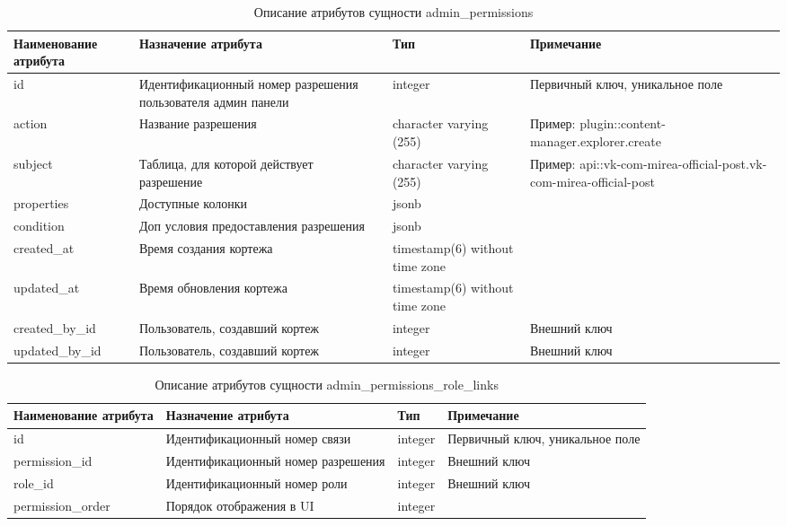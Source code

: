 \documentclass{mirea}
\begin{document}
	\begin{longtable}{ |p{}|p{}|p{}|p{}| } 
		\caption{Описание атрибутов сущности admin\_permissions}
		\label{tab:attributes_first_table}
		\endfirsthead
		\endhead
		\hline
		Наименование атрибута & Назначение атрибута & Тип & Примечание \\ \hline
		
		id & Идентификацион\-ный номер разрешения пользователя админ панели & integer & Первичный ключ, уникальное поле \\ \hline
		
		action & Название разрешения & character varying (255) & Пример: plugin::content-manager.explorer.\-create \\ \hline
		
		subject & Таблица, для которой действует разрешение  & character varying (255) & Пример: api::vk-com-mirea-official-post.vk-com-mirea-official-post \\ \hline
		
		properties & Доступные колонки  & jsonb & \\ \hline
		
		condition & Доп условия предоставления разрешения & jsonb & \\ \hline
		
		created\_at & Время создания кортежа & timestamp(6) without time zone & \\ \hline
		
		updated\_at & Время обновления кортежа & timestamp(6) without time zone & \\ \hline
		
		created\_by\_id & Пользователь, создавший кортеж & integer & Внешний ключ \\ \hline
		
		updated\_by\_id & Пользователь, создавший кортеж & integer & Внешний ключ \\ \hline
		
	\end{longtable}

	\begin{longtable}{ |p{}|p{}|p{}|p{}| } 
		\caption{Описание атрибутов сущности admin\_permissions\_role\_links}
		\endfirsthead
		\endhead
		\hline
		Наименование атрибута & Назначение атрибута & Тип & Примечание \\ \hline
		
		id & Идентификацион\-ный номер связи & integer & Первичный ключ, уникальное поле \\ \hline
		
		permission\_id & Идентификационный номер разрешения & integer & Внешний ключ \\ \hline
		
		role\_id & Идентификационный номер роли & integer & Внешний ключ \\ \hline
		
		permission\_order & Порядок отображения в UI & integer & \\ \hline
		
	\end{longtable}
\end{document}
